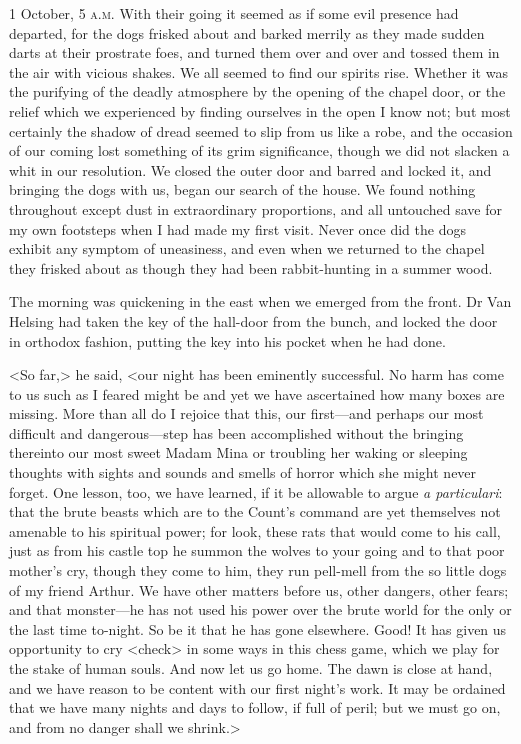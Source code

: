 \begin{diary}{1 October, 5 \textsc{a.m.}}
With their going it seemed as if some evil presence had departed, for the dogs frisked about and barked merrily as they made sudden darts at their prostrate foes, and turned them over and over and tossed them in the air with vicious shakes. We all seemed to find our spirits rise. Whether it was the purifying of the deadly atmosphere by the opening of the chapel door, or the relief which we experienced by finding ourselves in the open I know not; but most certainly the shadow of dread seemed to slip from us like a robe, and the occasion of our coming lost something of its grim significance, though we did not slacken a whit in our resolution. We closed the outer door and barred and locked it, and bringing the dogs with us, began our search of the house. We found nothing throughout except dust in extraordinary proportions, and all untouched save for my own footsteps when I had made my first visit. Never once did the dogs exhibit any symptom of uneasiness, and even when we returned to the chapel they frisked about as though they had been rabbit-hunting in a summer wood.

The morning was quickening in the east when we emerged from the front. Dr Van Helsing had taken the key of the hall-door from the bunch, and locked the door in orthodox fashion, putting the key into his pocket when he had done.

<So far,> he said, <our night has been eminently successful. No harm has come to us such as I feared might be and yet we have ascertained how many boxes are missing. More than all do I rejoice that this, our first—and perhaps our most difficult and dangerous—step has been accomplished without the bringing thereinto our most sweet Madam Mina or troubling her waking or sleeping thoughts with sights and sounds and smells of horror which she might never forget. One lesson, too, we have learned, if it be allowable to argue \textit{a particulari}: that the brute beasts which are to the Count's command are yet themselves not amenable to his spiritual power; for look, these rats that would come to his call, just as from his castle top he summon the wolves to your going and to that poor mother's cry, though they come to him, they run pell-mell from the so little dogs of my friend Arthur. We have other matters before us, other dangers, other fears; and that monster—he has not used his power over the brute world for the only or the last time to-night. So be it that he has gone elsewhere. Good! It has given us opportunity to cry <check> in some ways in this chess game, which we play for the stake of human souls. And now let us go home. The dawn is close at hand, and we have reason to be content with our first night's work. It may be ordained that we have many nights and days to follow, if full of peril; but we must go on, and from no danger shall we shrink.>


\end{diary}

